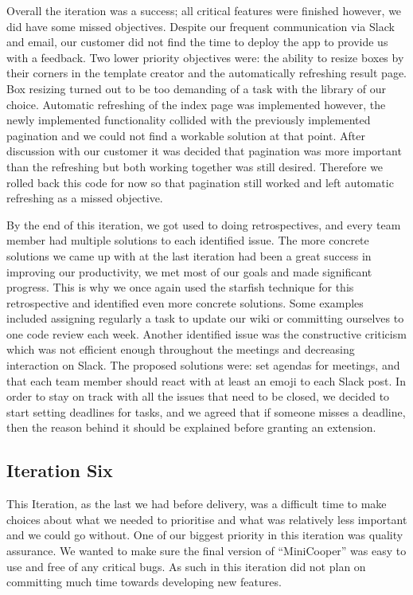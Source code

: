 \documentclass{l3proj}
\begin{document}
Overall the iteration was a success; all critical features were finished however, we did have some missed objectives. Despite our frequent communication via Slack and email, our customer did not find the time to deploy the app to provide us with a feedback. Two lower priority objectives were: the ability to resize boxes by their corners in the template creator and the automatically refreshing result page. Box resizing turned out to be too demanding of a task with the library of our choice. Automatic refreshing of the index page was implemented however, the newly implemented functionality collided with the previously implemented pagination and we could not find a workable solution at that point. After discussion with our customer it was decided that pagination was more important than the refreshing but both working together was still desired. Therefore we rolled back this code for now so that pagination still worked and left automatic refreshing as a missed objective. 

By the end of this iteration, we got used to doing retrospectives, and every team member had multiple solutions to each identified issue. The more concrete solutions we came up with at the last iteration had been a great success in improving our productivity, we met most of our goals and made significant progress. This is why we once again used the starfish technique for this retrospective and identified  even more concrete solutions. Some examples included assigning regularly a task to update our wiki or committing ourselves to one code review each week. Another identified issue was the constructive criticism which was not efficient enough throughout the meetings and decreasing interaction on Slack. The proposed solutions were: set agendas for meetings, and that each team member should react with at least an emoji to each Slack post.
In order to stay on track with all the issues that need to be closed, we decided to start setting deadlines for tasks, and we agreed that if someone misses a deadline, then the reason behind it should be explained before granting an extension.

\subsection{Iteration Six}

This Iteration, as the last we had before delivery, was a difficult time to make choices about what we needed to prioritise and what was relatively less important and we could go without. One of our biggest priority in this iteration was quality assurance. We wanted to make sure the final version of ``MiniCooper'' was easy to use and free of any critical bugs. As such in this iteration did not plan on committing much time towards developing new features.
\end{document}
